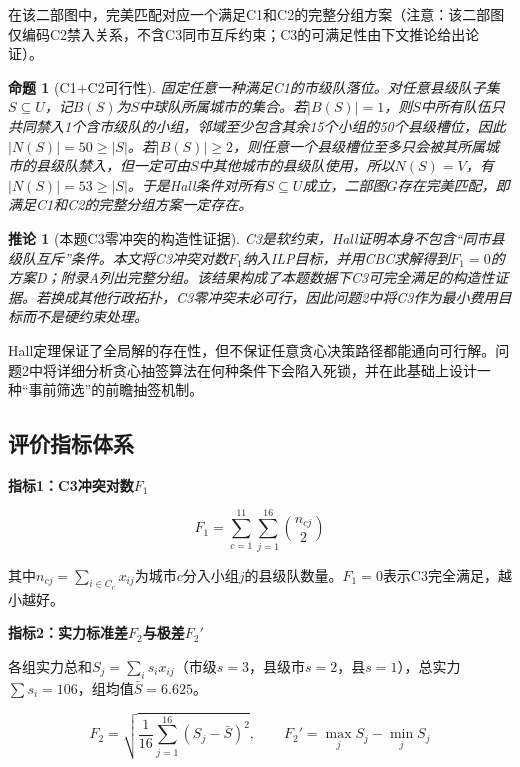\documentclass[12pt,a4paper]{article}
\newtheorem{proposition}[theorem]{命题}
\newtheorem{corollary}[theorem]{推论}
\begin{document}
在该二部图中，完美匹配对应一个满足C1和C2的完整分组方案（注意：该二部图仅编码C2禁入关系，不含C3同市互斥约束；C3的可满足性由下文推论给出论证）。

\begin{proposition}[C1+C2可行性]
  固定任意一种满足C1的市级队落位。对任意县级队子集$S\subseteq U$，记$B(S)$为$S$中球队所属城市的集合。若$|B(S)|=1$，则$S$中所有队伍只共同禁入1个含市级队的小组，邻域至少包含其余15个小组的50个县级槽位，因此$|N(S)|=50\ge |S|$。若$|B(S)|\ge 2$，则任意一个县级槽位至多只会被其所属城市的县级队禁入，但一定可由$S$中其他城市的县级队使用，所以$N(S)=V$，有$|N(S)|=53\ge |S|$。于是Hall条件对所有$S\subseteq U$成立，二部图$G$存在完美匹配，即满足C1和C2的完整分组方案一定存在。
\end{proposition}

\begin{corollary}[本题C3零冲突的构造性证据]
  C3是软约束，Hall证明本身不包含“同市县级队互斥”条件。本文将C3冲突对数$F_1$纳入ILP目标，并用CBC求解得到$F_1=0$的方案D；附录A列出完整分组。该结果构成了本题数据下C3可完全满足的构造性证据。若换成其他行政拓扑，C3零冲突未必可行，因此问题2中将C3作为最小费用目标而不是硬约束处理。
\end{corollary}

Hall定理保证了全局解的存在性，但不保证任意贪心决策路径都能通向可行解。问题2中将详细分析贪心抽签算法在何种条件下会陷入死锁，并在此基础上设计一种“事前筛选”的前瞻抽签机制。

\subsection{评价指标体系}

\textbf{指标1：C3冲突对数$F_1$}

\begin{equation}
  F_1 = \sum_{c=1}^{11} \sum_{j=1}^{16} \binom{n_{cj}}{2}
  \label{eq:F1}
\end{equation}

其中$n_{cj} = \sum_{i \in C_c} x_{ij}$为城市$c$分入小组$j$的县级队数量。$F_1 = 0$表示C3完全满足，越小越好。

\textbf{指标2：实力标准差$F_2$与极差$F_2'$}

各组实力总和$S_j = \sum_{i} s_i x_{ij}$（市级$s=3$，县级市$s=2$，县$s=1$），总实力$\sum s_i = 106$，组均值$\bar{S} = 6.625$。

\begin{equation}
  F_2 = \sqrt{\frac{1}{16} \sum_{j=1}^{16} (S_j - \bar{S})^2}, \qquad
  F_2' = \max_j S_j - \min_j S_j
  \label{eq:F2}
\end{equation}
\end{document}
